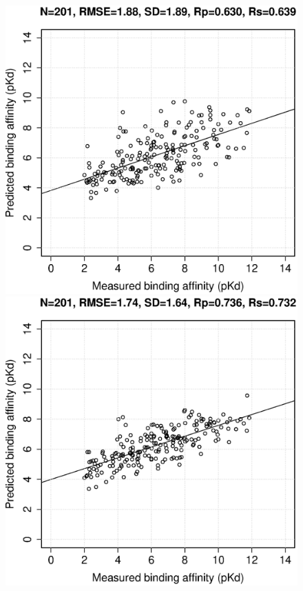 \documentclass[journal=jacsat,manuscript=article]{achemso}
\begin{document}
\begin{figure}[h!]
\endminipage
\\
\includegraphics[width=\linewidth]{../rfcyscore/x4/mlr/trn-247-tst-201-yp.eps}
\endminipage
{}
\includegraphics[width=\linewidth]{../rfcyscore/x46/rf/trn-2696-tst-201-yp.eps}

\end{figure}
\end{document}
